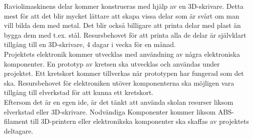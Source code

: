 Raviolimaskinens delar kommer konstrueras med hjälp av en 3D-skrivare. Detta mest för att det blir mycket lättare att skapa vissa delar som är svårt om man vill bilda dem med metal. Det blir också billigare att printa delar med plast än bygga dem med t.ex. stål. Resursbehovet för att printa alla de delar är självklart tillgång till en 3D-skrivare, 4 dagar i vecka för en månad.\\

Projektets elektronik kommer utvecklas med användning av några elektroniska komponenter. En prototyp av kretsen ska utvecklas och användas under projektet. Ett kretskort kommer tillverkas när prototypen har fungerad som det ska. Resursbehovet för elektroniken utöver komponenterna ska möjligen vara tillgång till elverkstad för att kunna ett kretskort.\\

Eftersom det är en egen ide, är det tänkt att använda skolan resurser liksom elverkstad eller 3D-skrivare. Nodvändiga Komponenter kommer liksom ABS-filament till 3D-printern eller elektronikska komponenter ska skaffas av projektets deltagare.


